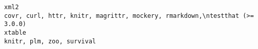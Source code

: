 \documentclass[
  letterpaper,
  DIV=11,
  numbers=noendperiod]{scrreprt}
\begin{document}
\begin{verbatim}
xml2                                                                                                                                                                                                                                                                                                                                                                                                                                                                                                                                                                                                                                                                                                                                                                                                                                                                                                                                                                                                                                                                                                                                                                                                                              covr, curl, httr, knitr, magrittr, mockery, rmarkdown,\ntestthat (>= 3.0.0)
xtable                                                                                                                                                                                                                                                                                                                                                                                                                                                                                                                                                                                                                                                                                                                                                                                                                                                                                                                                                                                                                                                                                                                                                                                                                                                                              knitr, plm, zoo, survival

\end{verbatim}
\end{document}
